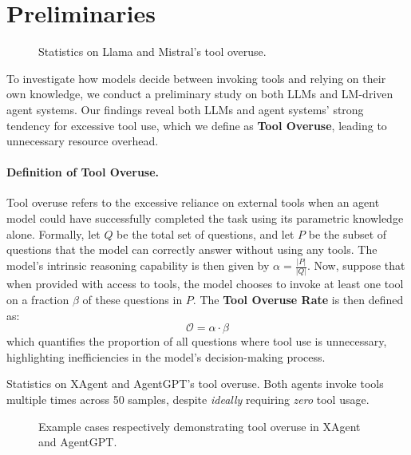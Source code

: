 \section{Preliminaries}

\begin{figure}[!t]
    \centering
    \caption{Statistics on Llama and Mistral's tool overuse.}
    \label{fig:preliminary_model}
\end{figure}

To investigate how models decide between invoking tools and relying on their own knowledge, we conduct a preliminary study on both LLMs and LM-driven agent systems. Our findings reveal both LLMs and agent systems' strong tendency for excessive tool use, which we define as \textbf{Tool Overuse}, leading to unnecessary resource overhead.

\label{sec:tool_overuse}
\paragraph{Definition of Tool Overuse.}
Tool overuse refers to the excessive reliance on external tools when an agent model could have successfully completed the task using its parametric knowledge alone.
Formally, let \( Q \) be the total set of questions, and let \( P \) be the subset of questions that the model can correctly answer without using any tools. The model's intrinsic reasoning capability is then given by \( \alpha = \frac{|P|}{|Q|} \). Now, suppose that when provided with access to tools, the model chooses to invoke at least one tool on a fraction \( \beta \) of these questions in \( P \). The \textbf{Tool Overuse Rate} is then defined as:
\[
\mathcal{O} = \alpha \cdot \beta
\]
which quantifies the proportion of all questions where tool use is unnecessary, highlighting inefficiencies in the model's decision-making process.


\begin{table}[!t]
    \centering
    \caption{Statistics on XAgent and AgentGPT's tool overuse. Both agents invoke tools multiple times across 50 samples, despite \textit{ideally} requiring \textit{zero} tool usage.}
    \label{tab:preliminary_agent_table}
\end{table}

\begin{figure}[!t]
    \centering
    \caption{Example cases respectively demonstrating tool overuse in XAgent and AgentGPT.}
    \label{fig:preliminary_agent}
\end{figure}


